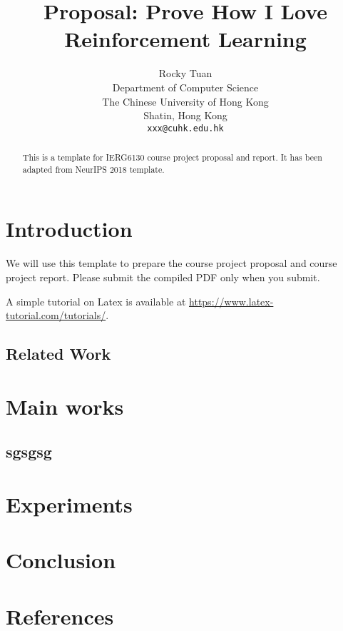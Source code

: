 \documentclass{article}
\title{Proposal: Prove How I Love Reinforcement Learning}
\author{%
  Rocky Tuan \\
  Department of Computer Science\\
  The Chinese University of Hong Kong\\
  Shatin, Hong Kong \\
  \texttt{xxx@cuhk.edu.hk} \\
}
\begin{document}

\maketitle

\begin{abstract}
This is a template for IERG6130 course project proposal and report. It has been adapted from NeurIPS 2018 template. 
\end{abstract}

\section{Introduction}

We will use this template to prepare the course project proposal and course project report. Please submit the compiled PDF only when you submit. 

A simple tutorial on Latex is available at \url{https://www.latex-tutorial.com/tutorials/}.


\subsection{Related Work}


\section{Main works}
\subsection{sgsgsg}

\section{Experiments}



\section{Conclusion}





\section*{References}

\medskip

{\small


}
\end{document}
